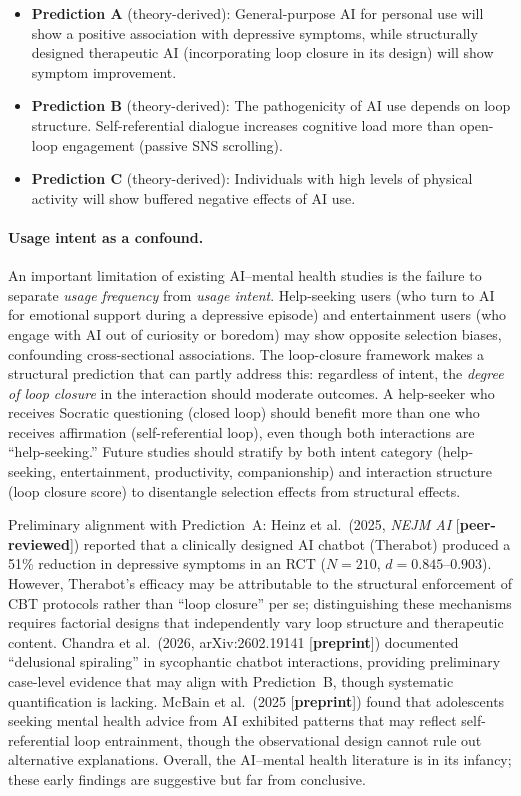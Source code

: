 \documentclass[a4paper,11pt,titlepage]{article}
\begin{document}
\begin{itemize}
  \item \textbf{Prediction A} (theory-derived): General-purpose AI for personal use will show a positive association with depressive symptoms, while structurally designed therapeutic AI (incorporating loop closure in its design) will show symptom improvement.
  \item \textbf{Prediction B} (theory-derived): The pathogenicity of AI use depends on loop structure. Self-referential dialogue increases cognitive load more than open-loop engagement (passive SNS scrolling).
  \item \textbf{Prediction C} (theory-derived): Individuals with high levels of physical activity will show buffered negative effects of AI use.
\end{itemize}

\paragraph{Usage intent as a confound.}
An important limitation of existing AI--mental health studies is the failure to separate \emph{usage frequency} from \emph{usage intent}. Help-seeking users (who turn to AI for emotional support during a depressive episode) and entertainment users (who engage with AI out of curiosity or boredom) may show opposite selection biases, confounding cross-sectional associations. The loop-closure framework makes a structural prediction that can partly address this: regardless of intent, the \emph{degree of loop closure} in the interaction should moderate outcomes. A help-seeker who receives Socratic questioning (closed loop) should benefit more than one who receives affirmation (self-referential loop), even though both interactions are ``help-seeking.'' Future studies should stratify by both intent category (help-seeking, entertainment, productivity, companionship) and interaction structure (loop closure score) to disentangle selection effects from structural effects.

Preliminary alignment with Prediction~A: Heinz et al.~(2025, \textit{NEJM AI} [\textbf{peer-reviewed}]) reported that a clinically designed AI chatbot (Therabot) produced a 51\% reduction in depressive symptoms in an RCT ($N = 210$, $d = 0.845$--$0.903$). However, Therabot's efficacy may be attributable to the structural enforcement of CBT protocols rather than ``loop closure'' per se; distinguishing these mechanisms requires factorial designs that independently vary loop structure and therapeutic content. Chandra et al.~(2026, arXiv:2602.19141 [\textbf{preprint}]) documented ``delusional spiraling'' in sycophantic chatbot interactions, providing preliminary case-level evidence that may align with Prediction~B, though systematic quantification is lacking. McBain et al.~(2025 [\textbf{preprint}]) found that adolescents seeking mental health advice from AI exhibited patterns that may reflect self-referential loop entrainment, though the observational design cannot rule out alternative explanations. Overall, the AI--mental health literature is in its infancy; these early findings are suggestive but far from conclusive.
\end{document}
